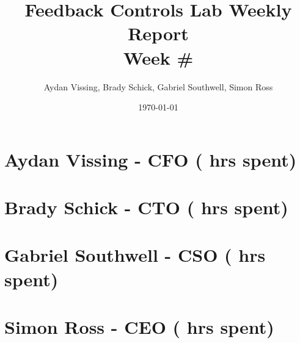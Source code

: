 \documentclass[12pt, titlepage]{article}
\title{Feedback Controls Lab Weekly Report \\ \normalsize{Week \#}}
\author{Aydan Vissing, Brady Schick, Gabriel Southwell, Simon Ross}
\date{\today}
\begin{document}
\maketitle

\section*{Aydan Vissing - CFO ( hrs spent)}



\section*{Brady Schick - CTO ( hrs spent)}



\section*{Gabriel Southwell - CSO ( hrs spent)}



\section*{Simon Ross - CEO ( hrs spent)}
\end{document}
